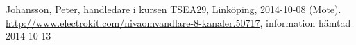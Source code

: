 \begin{thebibliography}{9}
 Johansson, Peter, handledare i kursen TSEA29, Linköping, 2014-10-08 (Möte).
 \url{http://www.electrokit.com/nivaomvandlare-8-kanaler.50717}, information hämtad 2014-10-13
\end{thebibliography}